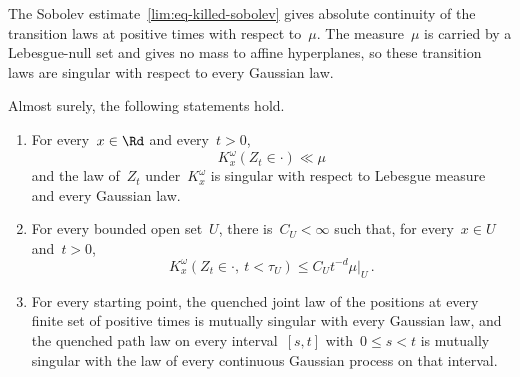\documentclass[11pt]{amsart}
\begin{document}
The Sobolev estimate~\eqref{lim:eq-killed-sobolev} gives absolute continuity of the transition laws at positive times with respect to~$\mu$. The measure~$\mu$ is carried by a Lebesgue-null set and gives no mass to affine hyperplanes, so these transition laws are singular with respect to every Gaussian law.

\begin{theorem}
\label{lim:thm-nongaussian}
\label{lim:lem-transition-domination}
Almost surely, the following statements hold.
\begin{enumerate}[label=(\roman*)]
\item For every~$x\in\Rd$ and every~$t>0$,
\begin{equation}
	K_x^\omega(Z_t\in\cdot)\ll\mu
	\label{lim:eq-transition-domination}
\end{equation}
and the law of~$Z_t$ under~$K_x^\omega$ is singular with respect to Lebesgue measure and every Gaussian law.
\item For every bounded open set~$U$, there is~$C_U<\infty$ such that, for every~$x\in U$ and~$t>0$,
\begin{equation*}
	K_x^\omega(Z_t\in\cdot,\ t<\tau_U)
	\leq C_Ut^{-d}\mu|_U\,.
\end{equation*}
\item For every starting point, the quenched joint law of the positions at every finite set of positive times is mutually singular with every Gaussian law, and the quenched path law on every interval~$[s,t]$ with~$0\leq s<t$ is mutually singular with the law of every continuous Gaussian process on that interval.
\end{enumerate}
\end{theorem}
\end{document}
